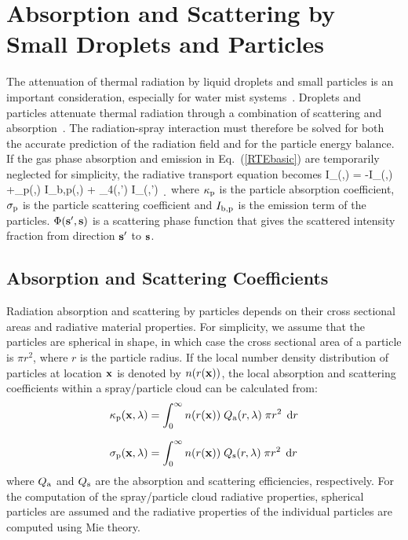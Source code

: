 \clearpage

\section{Absorption and Scattering by Small Droplets and Particles}
\label{droplet-radiation}

The attenuation of thermal radiation by liquid droplets and small particles is an important consideration, especially for water mist systems~\cite{Ravigururajan:1}.  Droplets and particles attenuate thermal radiation through a combination of scattering and absorption~\cite{Tuntomo:1}.  The radiation-spray interaction must therefore be solved for both the accurate prediction of the radiation field and for the particle energy balance. If the gas phase absorption and emission in Eq.~(\ref{RTEbasic}) are temporarily neglected for simplicity, the radiative transport equation becomes
\be
\bs \cdot \nabla I_{\la}(\bx,\bs) = -
I_{\la}(\bx,\bs) +\kappa_{\rm p}(\bx,\la) \; I_{{\rm b,p}}(\bx,\la) +
\int_{4\pi}\Phi(\bs,\bs') \; I_{\la}(\bx,\bs') \, \d\Omega
\label{RTEspray}
\ee
where $\kappa_{\rm p}$ is the particle absorption coefficient, $\sigma_{\rm p}$ is the particle scattering coefficient and $I_{{\rm b,p}}$ is the emission term of the particles. $\Phi({\mathbf{s}}',{\mathbf{s}})$ is a scattering phase function that gives the scattered intensity fraction from direction ${\mathbf{s}}'$ to ${\mathbf{s}}$.

\subsection{Absorption and Scattering Coefficients}

Radiation absorption and scattering by particles depends on their cross sectional areas and radiative material properties. For simplicity, we assume that the particles are spherical in shape, in which case the cross sectional area of a particle is $\pi r^2$, where $r$ is the particle radius. If the local number density distribution of particles at location ${\mathbf{x}}$ is denoted by $n(r({\mathbf{x}}))$, the local absorption and scattering coefficients within a spray/particle cloud can be calculated from:
\begin{align}
\kappa_{\rm p}(\bx,\la) &= \int_0^\infty n(r(\bx)) \; Q_{\rm a}(r,\la) \; \pi r^2 \; \d r \\[0.1in] %
\sigma_{\rm p}(\bx,\la) &= \int_0^\infty n(r(\bx)) \; Q_{\rm s}(r,\la) \; \pi r^2 \; \d r           %
\end{align}
where $Q_{\rm a}$ and $Q_{\rm s}$ are the absorption and scattering efficiencies, respectively. For the computation of the spray/particle cloud radiative properties, spherical particles are assumed and the radiative properties of the individual particles are computed using Mie theory.

